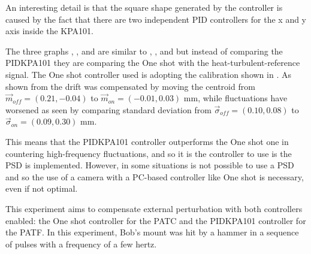 An interesting detail is that the square shape generated by the controller is caused by the fact that there are two independent PID controllers for the x and y axis inside the KPA101.


The three graphs , , and  are similar to , , and  but instead of comparing the PIDKPA101 they are comparing the One shot with the heat-turbulent-reference signal. The One shot controller used is adopting the calibration shown in .
As shown from  the drift was compensated by moving the centroid from $\vec{m}_{off} = (0.21, -0.04)$ to $\vec{m}_{on} = (-0.01, 0.03)$ mm, while fluctuations have worsened as seen by comparing standard deviation from $\vec{\sigma}_{off} = (0.10, 0.08)$ to $\vec{\sigma}_{on} = (0.09, 0.30)$ mm.

This means that the PIDKPA101 controller outperforms the One shot one in countering high-frequency fluctuations, and so it is the controller to use is the PSD is implemented. However, in some situations is not possible to use a PSD and so the use of a camera with a PC-based controller like One shot is necessary, even if not optimal.

This experiment aims to compensate external perturbation with both controllers enabled: the One shot controller for the PATC and the PIDKPA101 controller for the PATF.
In this experiment, Bob’s mount was hit by a hammer in a sequence of pulses with a frequency of a few hertz.

